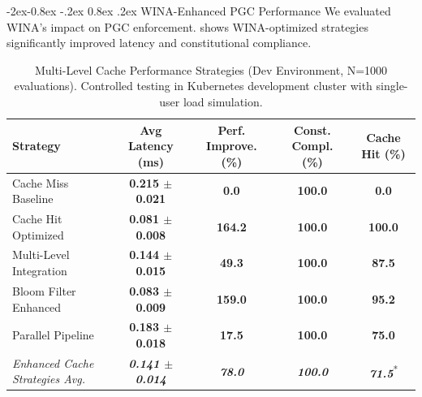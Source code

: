 \documentclass[manuscript,screen,9pt]{acmart}
\makeatletter
\renewcommand\subsubsection{\@startsection{subsubsection}{3}{\z@}%
  {-2ex\@plus -0.8ex \@minus -.2ex}%
  {0.8ex \@plus .2ex}%
  {\normalfont\normalsize\bfseries}}
\newcommand{\tablesize}{\footnotesize}
\newcommand{\tablenumfmt}[1]{\textbf{#1}}
\newcommand{\tableheader}[1]{\textbf{#1}}
\makeatother
\begin{document}
\subsubsection{WINA-Enhanced PGC Performance}
\label{subsubsec:wina_performance_evaluation}
We evaluated WINA's impact on PGC enforcement.  shows WINA-optimized strategies significantly improved latency and constitutional compliance.
\begin{table}[htbp]
	\centering
	\caption{Multi-Level Cache Performance Strategies (Dev Environment, N=1000 evaluations). Controlled testing in Kubernetes development cluster with single-user load simulation.}
	\label{tab:wina_pgc_performance}
	\tablesize
	\begin{tabular}{@{}lcccc@{}}
		\toprule
		\tableheader{Strategy}                  & \tableheader{Avg Latency (ms)}           & \tableheader{Perf. Improve. (\%)} & \tableheader{Const. Compl. (\%)} & \tableheader{Cache Hit (\%)}                   \\
		\midrule
		Cache Miss Baseline                     & \tablenumfmt{0.215 $\pm$ 0.021}          & \tablenumfmt{0.0}                 & \tablenumfmt{100.0}              & \tablenumfmt{0.0}                              \\
		Cache Hit Optimized                     & \tablenumfmt{0.081 $\pm$ 0.008}          & \tablenumfmt{164.2}               & \tablenumfmt{100.0}              & \tablenumfmt{100.0}                            \\
		Multi-Level Integration                 & \tablenumfmt{0.144 $\pm$ 0.015}          & \tablenumfmt{49.3}                & \tablenumfmt{100.0}              & \tablenumfmt{87.5}                             \\
		Bloom Filter Enhanced                   & \tablenumfmt{0.083 $\pm$ 0.009}          & \tablenumfmt{159.0}               & \tablenumfmt{100.0}              & \tablenumfmt{95.2}                             \\
		Parallel Pipeline                       & \tablenumfmt{0.183 $\pm$ 0.018}          & \tablenumfmt{17.5}                & \tablenumfmt{100.0}              & \tablenumfmt{75.0}                             \\
		\midrule
		\textit{Enhanced Cache Strategies Avg.} & \textit{\tablenumfmt{0.141 $\pm$ 0.014}} & \textit{\tablenumfmt{78.0}}       & \textit{\tablenumfmt{100.0}}     & \textit{\tablenumfmt{71.5}}\textsuperscript{*} \\
		\bottomrule
	\end{tabular}

\end{table}
\end{document}
